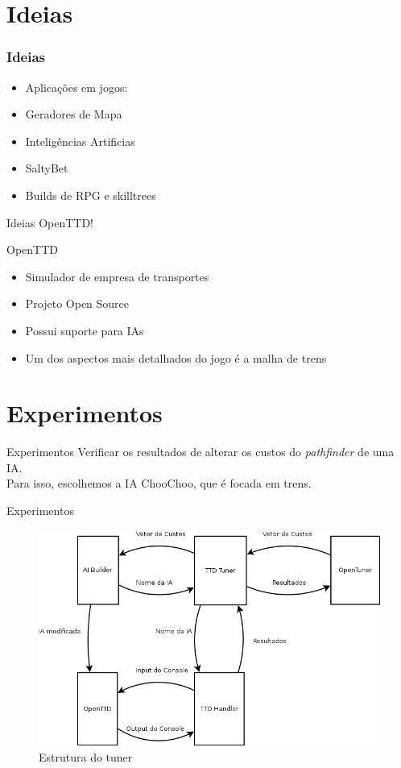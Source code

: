 \documentclass[10pt]{beamer}
\begin{document}
\section{Ideias}

\begin{frame}[fragile]
  \frametitle{Ideias}
	  \begin{itemize}
	  	\item Aplicações em jogos:
	  	\item Geradores de Mapa
	  	\item Inteligências Artificias
	  	\item SaltyBet
	  	\item Builds de RPG e skilltrees
	  \end{itemize}
\end{frame}

\begin{frame}{Ideias}
	OpenTTD!
\end{frame}

\begin{frame}{OpenTTD}	
	\begin{itemize}	[<+- | alert@+>]
		\item Simulador de empresa de transportes
		\item Projeto Open Source
		\item Possui suporte para IAs
		\item Um dos aspectos mais detalhados do jogo é a malha de trens
	\end{itemize}
\end{frame}

\section{Experimentos}
\begin{frame}{Experimentos}
	Verificar os resultados de alterar os custos do \textit{pathfinder} de uma IA.\pause\\
	Para isso, escolhemos a IA ChooChoo, que é focada em trens.
\end{frame}

\begin{frame}{Experimentos}
	\begin{figure}
\centering
\includegraphics[width=1\linewidth]{Diagrama1}
\caption{Estrutura do tuner}
\label{fig:Diagrama1}
\end{figure}

\end{frame}
	
\end{document}

